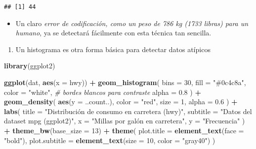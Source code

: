 \documentclass[
]{book}
\newenvironment{Shaded}{\begin{snugshade}}{\end{snugshade}}
\newcommand{\AttributeTok}[1]{\textcolor[rgb]{0.13,0.29,0.53}{#1}}
\newcommand{\CommentTok}[1]{\textcolor[rgb]{0.56,0.35,0.01}{\textit{#1}}}
\newcommand{\DecValTok}[1]{\textcolor[rgb]{0.00,0.00,0.81}{#1}}
\newcommand{\FloatTok}[1]{\textcolor[rgb]{0.00,0.00,0.81}{#1}}
\newcommand{\FunctionTok}[1]{\textcolor[rgb]{0.13,0.29,0.53}{\textbf{#1}}}
\newcommand{\NormalTok}[1]{#1}
\newcommand{\SpecialCharTok}[1]{\textcolor[rgb]{0.81,0.36,0.00}{\textbf{#1}}}
\newcommand{\StringTok}[1]{\textcolor[rgb]{0.31,0.60,0.02}{#1}}
\providecommand{\tightlist}{%
  \setlength{\itemsep}{0pt}\setlength{\parskip}{0pt}}
\begin{document}
\begin{Shaded}
\end{Shaded}

\begin{verbatim}
## [1] 44
\end{verbatim}

\begin{itemize}
\tightlist
\item
  Un claro \emph{error de codificación, como un peso de 786 kg (1733 libras) para un humano}, ya se detectará fácilmente con esta técnica tan sencilla.
\end{itemize}

\begin{enumerate}
\def\labelenumi{\arabic{enumi}.}
\setcounter{enumi}{1}
\tightlist
\item
  Un histograma es otra forma básica para detectar datos atípicos
\end{enumerate}

\begin{Shaded}
\begin{Highlighting}[]
\FunctionTok{library}\NormalTok{(ggplot2)}

\FunctionTok{ggplot}\NormalTok{(dat, }\FunctionTok{aes}\NormalTok{(}\AttributeTok{x =}\NormalTok{ hwy)) }\SpecialCharTok{+}
  \FunctionTok{geom\_histogram}\NormalTok{(}
    \AttributeTok{bins =} \DecValTok{30}\NormalTok{, }
    \AttributeTok{fill =} \StringTok{"\#0c4c8a"}\NormalTok{, }
    \AttributeTok{color =} \StringTok{"white"}\NormalTok{,     }\CommentTok{\# bordes blancos para contraste}
    \AttributeTok{alpha =} \FloatTok{0.8}
\NormalTok{  ) }\SpecialCharTok{+}
  \FunctionTok{geom\_density}\NormalTok{(}
    \FunctionTok{aes}\NormalTok{(}\AttributeTok{y =}\NormalTok{ ..count..), }
    \AttributeTok{color =} \StringTok{"red"}\NormalTok{, }
    \AttributeTok{size =} \DecValTok{1}\NormalTok{, }
    \AttributeTok{alpha =} \FloatTok{0.6}
\NormalTok{  ) }\SpecialCharTok{+}
  \FunctionTok{labs}\NormalTok{(}
    \AttributeTok{title =} \StringTok{"Distribución de consumo en carretera (hwy)"}\NormalTok{,}
    \AttributeTok{subtitle =} \StringTok{"Datos del dataset mpg (ggplot2)"}\NormalTok{,}
    \AttributeTok{x =} \StringTok{"Millas por galón en carretera"}\NormalTok{,}
    \AttributeTok{y =} \StringTok{"Frecuencia"}
\NormalTok{  ) }\SpecialCharTok{+}
  \FunctionTok{theme\_bw}\NormalTok{(}\AttributeTok{base\_size =} \DecValTok{13}\NormalTok{) }\SpecialCharTok{+}
  \FunctionTok{theme}\NormalTok{(}
    \AttributeTok{plot.title =} \FunctionTok{element\_text}\NormalTok{(}\AttributeTok{face =} \StringTok{"bold"}\NormalTok{),}
    \AttributeTok{plot.subtitle =} \FunctionTok{element\_text}\NormalTok{(}\AttributeTok{size =} \DecValTok{10}\NormalTok{, }\AttributeTok{color =} \StringTok{"gray40"}\NormalTok{)}
\NormalTok{  )}
\end{Highlighting}
\end{Shaded}
\end{document}
